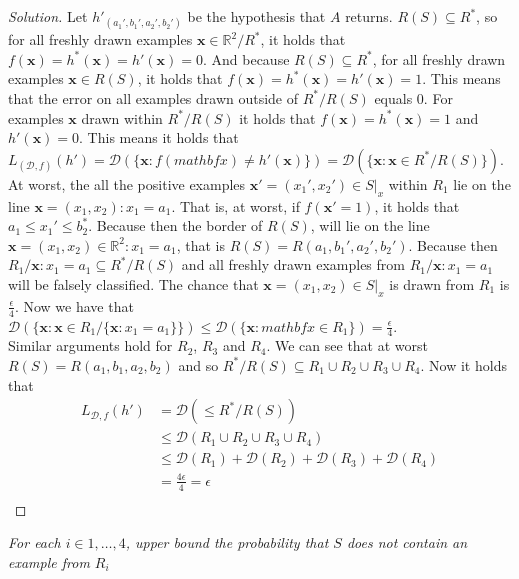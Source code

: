 \documentclass[10pt, a4paper, twoside]{amsart}
\newcommand{\R}{\ensuremath{\mathbb{R}}}
\newenvironment{solution}
               {\let\oldqedsymbol=\qedsymbol
                \renewcommand{\qedsymbol}{$\blacktriangleleft$}
                \begin{proof}[Solution]}
               {\end{proof}
                \renewcommand{\qedsymbol}{\oldqedsymbol}}
\begin{document}
\begin{solution}
  Let $h'_{(a_1',b_1',a_2',b_2')}$ be the hypothesis that $A$ returns. $R(S)\subseteq R^*$, so for all freshly drawn examples $\mathbf{x} \in \R^2/R^*$,  it holds that $f(\mathbf{x})=h^*(\mathbf{x}) = h'(\mathbf{x}) = 0$. And because $R(S)\subseteq R^*$, for all freshly drawn examples $\mathbf{x} \in R(S)$, it holds that $f(\mathbf{x})=h^*(\mathbf{x}) = h'(\mathbf{x}) = 1$. This means that the error on all examples drawn outside of $R^*/R(S)$ equals $0$. For examples $\mathbf{x}$ drawn within $R^*/R(S)$ it holds that $f(\mathbf{x})=h^*(\mathbf{x}) = 1$ and $h'(\mathbf{x}) = 0$. This means it holds that $L_{(\mathcal{D},f)}(h') = \mathcal{D}(\{\mathbf{x}: f(mathbf{x}) \neq h'(\mathbf{x})\}) = \mathcal{D}(\{\mathbf{x}:\mathbf{x}\in R^*/R(S)\})$. \\
  At worst, the all the positive examples $\mathbf{x'} = (x_1',x_2') \in S|_x$ within $R_1$ lie on the line $\mathbf{x}=(x_1,x_2):x_1 = a_1$. That is, at worst, if $f(\mathbf{x'} = 1)$, it holds that $a_1\leq x_1' \leq b_2^*$. Because then the border of $R(S)$, will lie on the line $\mathbf{x} = (x_1,x_2) \in \R^2: x_1 = a_1$, that is $R(S) = R(a_1,b_1',a_2',b_2')$. Because then $R_{1}/{\mathbf{x}:x_1=a_1} \subseteq R^*/R(S)$ and all freshly drawn examples from $R_{1}/{\mathbf{x}:x_1=a_1}$ will be falsely classified. The chance that $\mathbf{x} = (x_1,x_2) \in S|_x$ is drawn from $R_1$ is $\frac{\epsilon}{4}$. Now we have that $\mathcal{D}(\{\mathbf{x}: \mathbf{x} \in R_{1}/\{\mathbf{x}:x_1=a_1\}\}) \leq \mathcal{D}(\{\mathbf{x}: mathbf{x} \in R_{1}\}) = \frac{\epsilon}{4}$.\\
  Similar arguments hold for $R_2$, $R_3$ and $R_4$. We can see that at worst $R(S) = R(a_1,b_1,a_2,b_2)$ and so $R^*/R(S) \subseteq R_1 \cup R_2 \cup R_3 \cup R_4$. Now it holds that
\begin{align*}
  L_{\mathcal{D},f}(h') & = \mathcal{D}(\leq R^*/R(S)) \\
                      & \leq \mathcal{D}(R_1 \cup R_2 \cup R_3 \cup R_4) \\
                      & \leq \mathcal{D}(R_1) + \mathcal{D}(R_2) + \mathcal{D}(R_3) + \mathcal{D}(R_4)\\
 & = \frac{4\epsilon}{4} = \epsilon \\
\end{align*}  
\end{solution}
\textit{For each $i \in {1,\ldots,4}$, upper bound the probability that $S$ does not contain an example from $R_i$}\\
\end{document}
